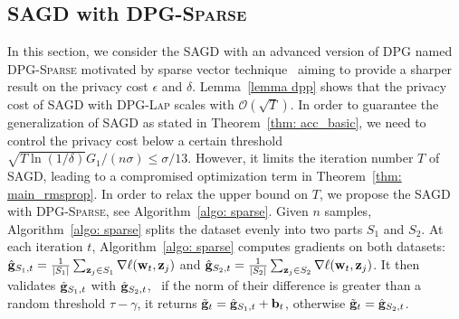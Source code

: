 \documentclass[11pt]{article}
\begin{document}
\vspace{-0.05in}
\subsection{\textsc{SAGD} with \textsc{DPG-Sparse}} \label{subsec: SAGD-sparse}
\vspace{-0.05in}

In this section, we consider the \textsc{SAGD} with an advanced version of \textsc{DPG} named \textsc{DPG-Sparse} motivated by sparse vector technique~\citep{dwro2014} aiming to provide a sharper result on the privacy cost $\epsilon$ and $\delta$.
Lemma~\ref{lemma dpp} shows that the privacy cost of \textsc{SAGD} with \textsc{DPG-Lap} scales with $\mathcal{O}(\sqrt{T})$. In order to guarantee the generalization of \textsc{SAGD} as stated in Theorem~\ref{thm: acc_basic}, we need to control the privacy cost below a certain threshold \ie $\sqrt{T \ln(1/\delta)} G_1/(n\sigma) \leq \sigma/13$. However, it limits the iteration number $T$ of \textsc{SAGD}, leading to a compromised optimization term in Theorem~\ref{thm: main_rmsprop}.  
In order to relax the upper bound on $T$, we propose the \textsc{SAGD} with \textsc{DPG-Sparse}, see Algorithm~\ref{algo: sparse}.
Given $n$ samples, Algorithm~\ref{algo: sparse} splits the dataset evenly into two parts $S_1$ and $S_2$. 
At each iteration $t$, Algorithm~\ref{algo: sparse} computes gradients on both datasets:
$\hat {\mathbf{g}}_{S_1,t} = \frac{1}{|S_1|} \sum_{\mathbf{z}_j \in S_1}\nabla \ell(\mathbf{w}_t, \mathbf{z}_j)$ and $\hat {\mathbf{g}}_{S_2,t} = \frac{1}{|S_2|} \sum_{\mathbf{z}_j \in S_2}\nabla \ell(\mathbf{w}_t, \mathbf{z}_j)$.
It then validates $\hat {\mathbf{g}}_{S_1,t} $ with $\hat {\mathbf{g}}_{S_2,t}$, \ie\ if the norm of their difference is greater than a random threshold $\tau-\gamma$, it returns $\tilde {\mathbf{g}}_t = \hat {\mathbf{g}}_{S_1,t} + \mathbf{b}_t$, otherwise $\tilde {\mathbf{g}}_t = \hat {\mathbf{g}}_{S_2,t}$.%
\end{document}
